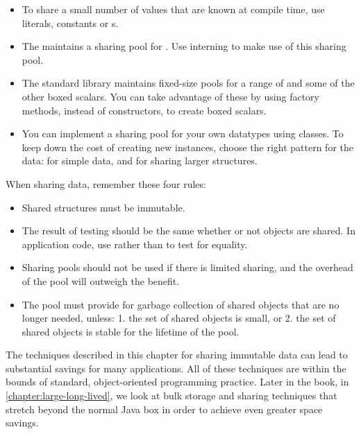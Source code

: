 \begin{itemize}
  \item To share a small number of values that are known at compile time, use
   literals,  constants or s.
  \item The \jre maintains a sharing
  pool for . Use  interning to make use of this
  sharing pool.
  \item The standard library maintains fixed-size pools for
   a range of  and some of the other boxed scalars. You
   can take advantage of these by using  factory methods, instead
   of constructors, to create boxed scalars.
   \item You can implement a sharing pool for your own datatypes using
    classes. To keep down the cost of creating new instances, choose
   the right pattern for the data:  for
   simple data, and  for sharing larger structures.
\end{itemize}

When sharing data, remember these four rules:
\begin{itemize}
  \item Shared structures must be immutable.
  \item The result of  testing should be the same whether or
not objects are shared. In application code, use  rather than
\code{==} to test for equality.
  \item Sharing pools should not be used if there is limited sharing, and the
  overhead of the pool will outweigh the benefit.
  \item The pool must provide for garbage collection of shared objects
  that are no longer needed, unless: 1. the set of shared objects is
  small, or 2. the set of shared objects is stable for the lifetime of the
  pool.
\end{itemize}

The techniques described in this chapter for sharing immutable
data can lead to substantial savings for many applications.  All of these
techniques are within the bounds of standard, object-oriented programming
practice. Later in the book, in \autoref{chapter:large-long-lived}, we look at
bulk storage and sharing techniques that stretch beyond the normal Java box in
order to achieve even greater space savings. 






